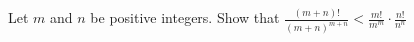 Let $m$ and $n$ be positive integers. Show that
$\frac{(m+n)!}{(m+n)^{m+n}} < \frac{m!}{m^m}\cdot\frac{n!}{n^n}$